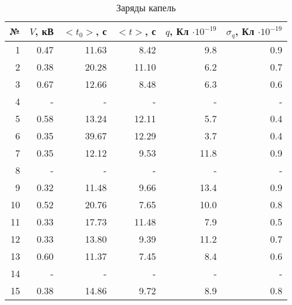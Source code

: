 \begin{table}[h]
\begin{center} 
 \label{table1}
 \caption{Заряды капель}
\begin{tabular}{|*{6}{r|}}
\hline 
№ & $V$, кВ & $<t_0>$, с & $<t>$, с & $q$, Кл $ \cdot 10^{-19}$ & $\sigma_q$, Кл $ \cdot 10^{-19}$ \\ \hline 
 1  & 0.47 & 11.63 &  8.42 &  9.8 & 0.9 \\ \hline 
 2  & 0.38 & 20.28 & 11.10 &  6.2 & 0.7 \\ \hline 
 3  & 0.67 & 12.66 &  8.48 &  6.3 & 0.6 \\ \hline 
 4  & -    & -     & -     & -    & -   \\ \hline 
 5  & 0.58 & 13.24 & 12.11 &  5.7 & 0.4 \\ \hline 
 6  & 0.35 & 39.67 & 12.29 &  3.7 & 0.4 \\ \hline 
 7  & 0.35 & 12.12 &  9.53 & 11.8 & 0.9 \\ \hline 
 8  & -    & -     & -     & -    & -   \\ \hline 
 9  & 0.32 & 11.48 &  9.66 & 13.4 & 0.9 \\ \hline 
 10 & 0.52 & 20.76 &  7.65 & 10.0 & 0.8 \\ \hline 
 11 & 0.33 & 17.73 & 11.48 &  7.9 & 0.5 \\ \hline 
 12 & 0.33 & 13.80 &  9.39 & 11.2 & 0.7 \\ \hline 
 13 & 0.60 & 11.37 &  7.45 &  8.4 & 0.6 \\ \hline 
 14 & -    & -     &  -    & -    & -   \\ \hline 
 15 & 0.38 & 14.86 &  9.72 &  8.9 & 0.8 \\ \hline 
 \end{tabular}
\end{center} 
\end{table} 
